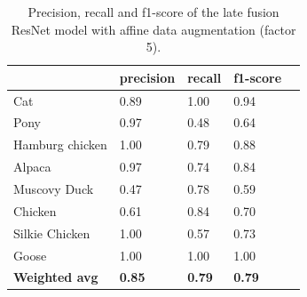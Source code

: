 \documentclass{l4proj}
\begin{document}
\begin{appendices}
\begin{table}[H]
  \centering
  \begin{tabular}{@{}lllll@{}}
  \toprule
                        & \textbf{precision} & \textbf{recall} & \textbf{f1-score} &  \\ \midrule
  Cat                   & 0.89               & 1.00            & 0.94              &  \\
  Pony                  & 0.97               & 0.48            & 0.64              &  \\
  Hamburg chicken       & 1.00               & 0.79            & 0.88              &  \\
  Alpaca                & 0.97               & 0.74            & 0.84              &  \\
  Muscovy Duck          & 0.47               & 0.78            & 0.59              &  \\
  Chicken               & 0.61               & 0.84            & 0.70              &  \\
  Silkie Chicken        & 1.00               & 0.57            & 0.73              &  \\
  Goose                 & 1.00               & 1.00            & 1.00              &  \\
  \midrule
  \textbf{Weighted avg} & \textbf{0.85}      & \textbf{0.79}   & \textbf{0.79}     &  \\ \bottomrule
  \end{tabular}
  \vspace*{3mm}
  \caption{Precision, recall and f1-score of the late fusion ResNet model with affine data augmentation (factor 5).}
  \label{table:appendix_affine_3}
  \vspace*{-3mm}
\end{table}


\end{appendices}
\end{document}

